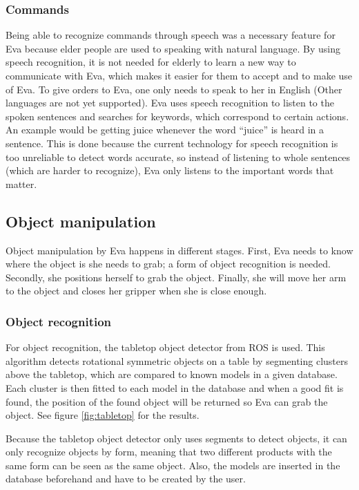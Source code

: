 \documentclass[project_eva.tex]{subfiles}
\begin{document}
\subsubsection*{Commands}
Being able to recognize commands through speech was a necessary feature for Eva because elder people are used to speaking 
with natural language. By using speech recognition, it is not needed for elderly to learn a new way to communicate with 
Eva, which makes it easier for them to accept and to make use of Eva. To give orders to Eva, one only needs to speak to her in English (Other languages are not yet supported). Eva uses speech recognition to listen to the spoken sentences and searches for keywords, which correspond to certain actions. An example would be getting juice whenever the word ``juice'' is heard in a sentence. This is done because the current technology for speech recognition is too unreliable to detect words accurate, so instead of listening to whole sentences (which are harder to recognize), Eva only listens to the important words that matter.

\subsection*{Object manipulation}
Object manipulation by Eva happens in different stages. First, Eva needs to know where the object is she needs to grab; a form of object recognition is needed. Secondly, she  positions herself to grab the object. Finally, she will move her arm to the object and closes her gripper when she is close enough.

\subsubsection*{Object recognition}
For object recognition, the tabletop object detector from ROS is used. This algorithm detects rotational symmetric objects on a table by segmenting clusters above the tabletop, which are compared to known models in a given database. Each cluster is then fitted to each model in the database and when a good fit is found, the position of the found object will be returned so Eva can grab the object. See figure \ref{fig:tabletop} for the results.

Because the tabletop object detector only uses segments to detect objects, it can only recognize objects by form, meaning that two different products with the same form can be seen as the same object. Also, the models are inserted in the database beforehand and have to be created by the user.
\end{document}
